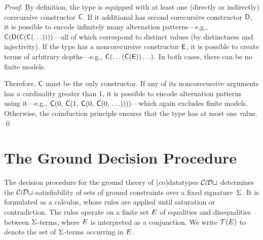 \begin{report}
\begin{proof}
By definition, the type is equipped with at least one (directly or indirectly)
corecursive constructor $\textsf{C}$. If it additional has second
corecursive constructor $\textsf{D}$, it is possible to encode infinitely many
alternation patterns---e.g.,
$\textsf{C}(\textsf{D}(\textsf{C}(\textsf{C}(\ldots))))$---all of which correspond
to distinct values (by distinctness and injectivity). If the type has a
noncorecursive constructor $\textsf{E}$, it is possible to create terms of
arbitrary depths---e.g., $\textsf{C}(\ldots(\textsf{C}(\textsf{E}))\ldots)$. In
both cases, there can be no finite models.

Therefore, $\textsf{C}$ must be the only constructor.
If any of its noncorecursive arguments has a cardinality greater than 1,
it is possible to encode alternation patterns using it---e.g.,
$\textsf{C}(0,\: \textsf{C}(1,\: \textsf{C}(0,\: \textsf{C}(0,\: \ldots))))$---which
again excludes finite models. Otherwise, the coinduction principle ensures
that the type has at most one value.
\qed
\end{proof}
\end{report}


\section{The Ground Decision Procedure} %
\label{sec:a-ground-decision-procedure-for-co-datatypes}

The decision procedure for the ground theory of (co)datatypes $\mathcal{CoDt}$ determines the
$\mathcal{CoDt}$-satisfiability of sets of ground constraints over a fixed
signature~$\mathrm{\Sigma}$. It is formulated as a calculus, whose rules are applied
until saturation or contradiction.
%
The rules operate on a finite set $E$ of equalities and disequalities
between $\mathrm{\Sigma}$-terms, where $E$ is interpreted as a conjunction.
We write $\mathcal{T}(E)$ to denote the set of $\mathrm{\Sigma}$-terms occurring in $E$.

